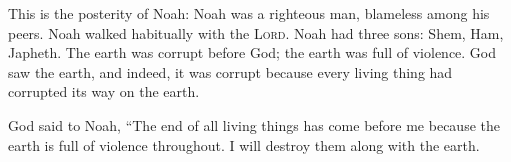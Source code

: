 \begin{inparaenum}
     This is the posterity of Noah: Noah was a righteous man, blameless among his peers. Noah walked habitually with the \textsc{Lord}.%
     Noah had three sons: Shem, Ham, Japheth.%
     The earth was corrupt before God; the earth was full of violence.%
     God saw the earth, and indeed, it was corrupt because every living thing had corrupted its way on the earth.%
    
     God said to Noah, ``The end of all living things has come before me because the earth is full of violence throughout. I will destroy them along with the earth.%
\end{inparaenum}
